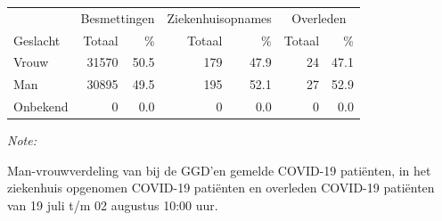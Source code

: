 \documentclass[
  english,
  man,floatsintext]{apa6}
\begin{document}
\begin{table}
\centering\begingroup\fontsize{11}{13}\selectfont

\begin{threeparttable}
\begin{tabular}{lrrrrrr}
\toprule
\multicolumn{1}{c}{ } & \multicolumn{2}{c}{Besmettingen} & \multicolumn{2}{c}{Ziekenhuisopnames} & \multicolumn{2}{c}{Overleden} \\
\cmidrule(l{3pt}r{3pt}){2-3} \cmidrule(l{3pt}r{3pt}){4-5} \cmidrule(l{3pt}r{3pt}){6-7}
Geslacht & Totaal & \% & Totaal & \% & Totaal & \%\\
\midrule
Vrouw & 31570 & 50.5 & 179 & 47.9 & 24 & 47.1\\
Man & 30895 & 49.5 & 195 & 52.1 & 27 & 52.9\\
Onbekend & 0 & 0.0 & 0 & 0.0 & 0 & 0.0\\
\bottomrule
\end{tabular}
\begin{tablenotes}
\item \textit{Note: } 
\item Man-vrouwverdeling van bij de GGD’en gemelde COVID-19 patiënten, in het ziekenhuis opgenomen COVID-19 patiënten en overleden COVID-19 patiënten van 19 juli t/m 02 augustus 10:00 uur.
\end{tablenotes}
\end{threeparttable}
\endgroup{}
\end{table}
\newpage
\end{document}
